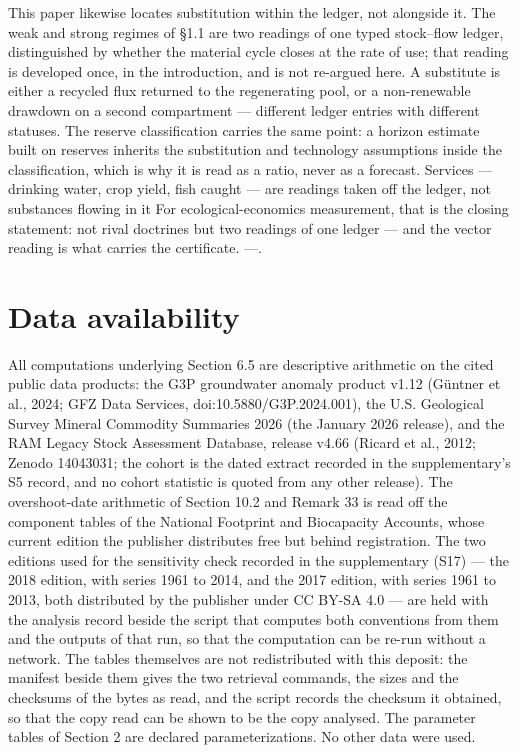 \documentclass[11pt]{article}
\begin{document}
This paper likewise locates substitution within the ledger, not alongside it. The weak and strong regimes of \S1.1 are two readings of one typed stock--flow ledger, distinguished by whether the material cycle closes at the rate of use; that reading is developed once, in the introduction, and is not re-argued here. A substitute is either a recycled flux returned to the regenerating pool, or a non-renewable drawdown on a second compartment --- different ledger entries with different statuses. The reserve classification carries the same point: a horizon estimate built on reserves inherits the substitution and technology assumptions inside the classification, which is why it is read as a ratio, never as a forecast. Services --- drinking water, crop yield, fish caught --- are readings taken off the ledger, not substances flowing in it For ecological-economics measurement, that is the closing statement: not rival doctrines but two readings of one ledger --- and the vector reading is what carries the certificate. ---.

\vspace{0.8em}

\section*{Data availability}\label{data-availability}

All computations underlying Section 6.5 are descriptive arithmetic on the cited public data products: the G3P groundwater anomaly product v1.12 (G\"{u}ntner et al., 2024; GFZ Data Services, doi:10.5880/\allowbreak{}G3P.2024.001), the U.S. Geological Survey Mineral Commodity Summaries 2026 (the January 2026 release), and the RAM Legacy Stock Assessment Database, release v4.66 (Ricard et al., 2012; Zenodo 14043031; the cohort is the dated extract recorded in the supplementary's S5 record, and no cohort statistic is quoted from any other release). The overshoot-date arithmetic of Section 10.2 and Remark 33 is read off the component tables of the National Footprint and Biocapacity Accounts, whose current edition the publisher distributes free but behind registration. The two editions used for the sensitivity check recorded in the supplementary (S17) --- the 2018 edition, with series 1961 to 2014, and the 2017 edition, with series 1961 to 2013, both distributed by the publisher under CC BY-SA 4.0 --- are held with the analysis record beside the script that computes both conventions from them and the outputs of that run, so that the computation can be re-run without a network. The tables themselves are not redistributed with this deposit: the manifest beside them gives the two retrieval commands, the sizes and the checksums of the bytes as read, and the script records the checksum it obtained, so that the copy read can be shown to be the copy analysed. The parameter tables of Section 2 are declared parameterizations. No other data were used.
\end{document}
